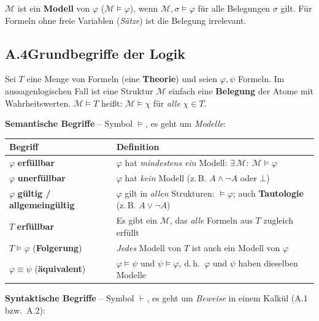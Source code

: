 \noindent$\mathcal{M}$ ist ein \textbf{Modell} von $\varphi$ ($\mathcal{M}\models\varphi$), wenn $\mathcal{M},\sigma\models\varphi$ für alle Belegungen $\sigma$ gilt. Für Formeln ohne freie Variablen (\emph{Sätze}) ist die Belegung irrelevant.

\newpage
\subsection*{A.4\quad Grundbegriffe der Logik}

Sei $T$ eine Menge von Formeln (eine \textbf{Theorie}) und seien $\varphi,\psi$ Formeln. Im aussagenlogischen Fall ist eine Struktur $\mathcal{M}$ einfach eine \textbf{Belegung} der Atome mit Wahrheitswerten. $\mathcal{M}\models T$ heißt: $\mathcal{M}\models\chi$ für \emph{alle} $\chi\in T$.

\medskip
\noindent\textbf{Semantische Begriffe} -- Symbol $\models$, es geht um \emph{Modelle}:

\begin{center}
\renewcommand{\arraystretch}{1.5}
\begin{tabularx}{\textwidth}{l X}
\textbf{Begriff} & \textbf{Definition} \\
\hline
$\varphi$ \textbf{erfüllbar} & $\varphi$ hat \emph{mindestens ein} Modell: $\exists\,\mathcal{M}:\ \mathcal{M}\models\varphi$ \\
$\varphi$ \textbf{unerfüllbar} & $\varphi$ hat \emph{kein} Modell (z.\,B. $A\wedge\neg A$ oder $\bot$) \\
$\varphi$ \textbf{gültig / allgemeingültig} & $\varphi$ gilt in \emph{allen} Strukturen: $\models\varphi$; auch \textbf{Tautologie} (z.\,B. $A\vee\neg A$) \\
$T$ \textbf{erfüllbar} & Es gibt ein $\mathcal{M}$, das \emph{alle} Formeln aus $T$ zugleich erfüllt \\
$T\models\varphi$ \quad(\textbf{Folgerung}) & \emph{Jedes} Modell von $T$ ist auch ein Modell von $\varphi$ \\
$\varphi\equiv\psi$ \quad(\textbf{äquivalent}) & $\varphi\models\psi$ und $\psi\models\varphi$, d.\,h.\ $\varphi$ und $\psi$ haben dieselben Modelle \\
\end{tabularx}
\end{center}

\medskip
\noindent\textbf{Syntaktische Begriffe} -- Symbol $\vdash$, es geht um \emph{Beweise} in einem Kalkül (A.1 bzw.\ A.2):

